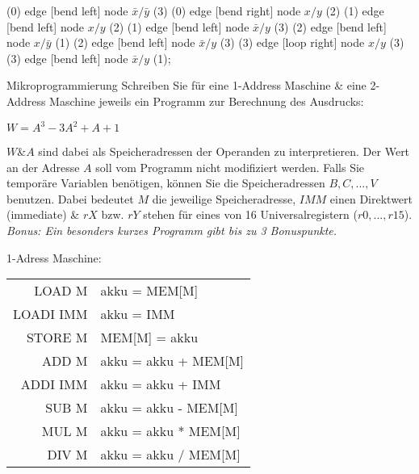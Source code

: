 \documentclass{exercisesheet}
\begin{document}
\begin{solution}
{    
    (0) edge [bend left] node {$\bar x/\bar y$} (3)
    (0) edge [bend right] node {$x/y$} (2)
    (1) edge [bend left] node {$x/y$} (2)
    (1) edge [bend left] node {$\bar x/y$} (3)
    (2) edge [bend left] node {$x/\bar y$} (1)
    (2) edge [bend left] node {$\bar x/y$} (3)
    (3) edge [loop right] node {$x/y$} (3)
    (3) edge [bend left] node {$\bar x/y$} (1);
  }
\end{solution}

\begin{exercise*}{Mikroprogrammierung}
  Schreiben Sie für eine 1-Address Maschine \& eine 2-Address Maschine jeweils ein Programm zur Berechnung des Ausdrucks:
  \begin{center}$W = A^3 - 3A^2 + A + 1$\end{center}
  $W$\&$A$ sind dabei als Speicheradressen der Operanden zu interpretieren. Der Wert an der Adresse $A$ soll vom Programm nicht modifiziert werden. Falls Sie temporäre Variablen benötigen, können Sie die Speicheradressen $B, C, ..., V$ benutzen. Dabei bedeutet $M$ die jeweilige Speicheradresse, $IMM$ einen Direktwert (immediate) \& $rX$ bzw. $rY$ stehen für eines von 16 Universalregistern ($r0, ..., r15$).\\
  \textit{Bonus: Ein besonders kurzes Programm gibt bis zu 3 Bonuspunkte.}
  \begin{multicols*}{2}
    1-Adress Maschine:\\
    \begin{tabular}{|r|l|}
      \hline
      LOAD M    & akku = MEM[M]        \\
      LOADI IMM & akku = IMM           \\
      STORE M   & MEM[M] = akku        \\
      ADD M     & akku = akku + MEM[M] \\
      ADDI IMM  & akku = akku + IMM    \\
      SUB M     & akku = akku - MEM[M] \\
      MUL M     & akku = akku * MEM[M] \\
      DIV M     & akku = akku / MEM[M] \\
      \hline
    \end{tabular}


\end{multicols*}
\end{exercise*}
\end{document}
